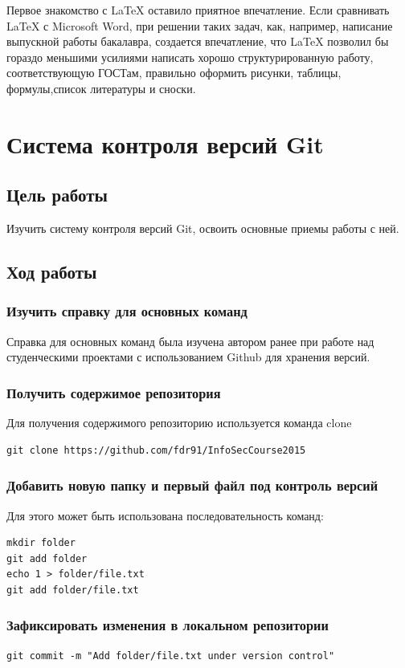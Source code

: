 \documentclass[12pt,a4paper]{article}
\begin{document}
Первое знакомство с LaTeX оставило приятное впечатление. Если сравнивать LaTeX с Microsoft Word, при решении таких задач, как, например, написание выпускной работы бакалавра, создается впечатление, что LaTeX позволил бы гораздо меньшими усилиями написать хорошо структурированную работу, соответствующую ГОСТам, правильно оформить рисунки, таблицы, формулы,список литературы и сноски.
\section{Система контроля версий Git}
\subsection{Цель работы}
Изучить систему контроля версий Git, освоить основные приемы работы
с ней.
\subsection{Ход работы}
\subsubsection{Изучить справку для основных команд}
Справка для основных команд была изучена автором ранее при работе над студенческими проектами с использованием Github для хранения версий.
\subsubsection{Получить содержимое репозитория}
Для получения содержимого репозиторию используется команда clone
\begin{verbatim}git clone https://github.com/fdr91/InfoSecCourse2015
\end{verbatim}
\subsubsection{Добавить новую папку и первый файл под контроль версий}
Для этого может быть использована последовательность команд:
\begin{verbatim}mkdir folder
git add folder
echo 1 > folder/file.txt
git add folder/file.txt\end{verbatim}
\subsubsection{Зафиксировать изменения в локальном репозитории}
\begin{verbatim}git commit -m "Add folder/file.txt under version control"
\end{verbatim}
\end{document}
